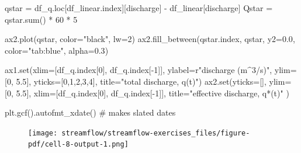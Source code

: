 \documentclass[
  letterpaper,
  DIV=11,
  numbers=noendperiod]{scrreprt}
\newenvironment{Shaded}{\begin{snugshade}}{\end{snugshade}}
\newcommand{\BuiltInTok}[1]{\textcolor[rgb]{0.00,0.23,0.31}{#1}}
\newcommand{\CommentTok}[1]{\textcolor[rgb]{0.37,0.37,0.37}{#1}}
\newcommand{\DecValTok}[1]{\textcolor[rgb]{0.68,0.00,0.00}{#1}}
\newcommand{\FloatTok}[1]{\textcolor[rgb]{0.68,0.00,0.00}{#1}}
\newcommand{\NormalTok}[1]{\textcolor[rgb]{0.00,0.23,0.31}{#1}}
\newcommand{\OperatorTok}[1]{\textcolor[rgb]{0.37,0.37,0.37}{#1}}
\newcommand{\StringTok}[1]{\textcolor[rgb]{0.13,0.47,0.30}{#1}}
\newcommand{\VerbatimStringTok}[1]{\textcolor[rgb]{0.13,0.47,0.30}{#1}}
\begin{document}
\begin{Shaded}
\begin{Highlighting}[]
\NormalTok{qstar }\OperatorTok{=}\NormalTok{ df\_q.loc[df\_linear.index][}\StringTok{\textquotesingle{}discharge\textquotesingle{}}\NormalTok{] }\OperatorTok{{-}}\NormalTok{ df\_linear[}\StringTok{\textquotesingle{}discharge\textquotesingle{}}\NormalTok{]}
\NormalTok{Qstar }\OperatorTok{=}\NormalTok{ qstar.}\BuiltInTok{sum}\NormalTok{() }\OperatorTok{*} \DecValTok{60} \OperatorTok{*} \DecValTok{5}

\NormalTok{ax2.plot(qstar, color}\OperatorTok{=}\StringTok{"black"}\NormalTok{, lw}\OperatorTok{=}\DecValTok{2}\NormalTok{)}
\NormalTok{ax2.fill\_between(qstar.index, qstar,}
\NormalTok{                 y2}\OperatorTok{=}\FloatTok{0.0}\NormalTok{,}
\NormalTok{                 color}\OperatorTok{=}\StringTok{"tab:blue"}\NormalTok{, alpha}\OperatorTok{=}\FloatTok{0.3}\NormalTok{)}

\NormalTok{ax1.}\BuiltInTok{set}\NormalTok{(xlim}\OperatorTok{=}\NormalTok{[df\_q.index[}\DecValTok{0}\NormalTok{],}
\NormalTok{              df\_q.index[}\OperatorTok{{-}}\DecValTok{1}\NormalTok{]],}
\NormalTok{        ylabel}\OperatorTok{=}\VerbatimStringTok{r"discharge (m$\^{}3$/s)"}\NormalTok{,}
\NormalTok{        ylim}\OperatorTok{=}\NormalTok{[}\DecValTok{0}\NormalTok{, }\FloatTok{5.5}\NormalTok{],}
\NormalTok{        yticks}\OperatorTok{=}\NormalTok{[}\DecValTok{0}\NormalTok{,}\DecValTok{1}\NormalTok{,}\DecValTok{2}\NormalTok{,}\DecValTok{3}\NormalTok{,}\DecValTok{4}\NormalTok{],}
\NormalTok{        title}\OperatorTok{=}\StringTok{"total discharge, q(t)"}\NormalTok{)}
\NormalTok{ax2.}\BuiltInTok{set}\NormalTok{(yticks}\OperatorTok{=}\NormalTok{[],}
\NormalTok{        ylim}\OperatorTok{=}\NormalTok{[}\DecValTok{0}\NormalTok{, }\FloatTok{5.5}\NormalTok{],}
\NormalTok{        xlim}\OperatorTok{=}\NormalTok{[df\_q.index[}\DecValTok{0}\NormalTok{],}
\NormalTok{              df\_q.index[}\OperatorTok{{-}}\DecValTok{1}\NormalTok{]],}
\NormalTok{        title}\OperatorTok{=}\StringTok{"effective discharge, q*(t)"}
\NormalTok{       )}

\NormalTok{plt.gcf().autofmt\_xdate()  }\CommentTok{\# makes slated dates}
\end{Highlighting}
\end{Shaded}

\begin{figure}[H]

{\centering \texttt{[image: streamflow/streamflow-exercises\_files/figure-pdf/cell-8-output-1.png]}

}

\end{figure}
\end{document}
